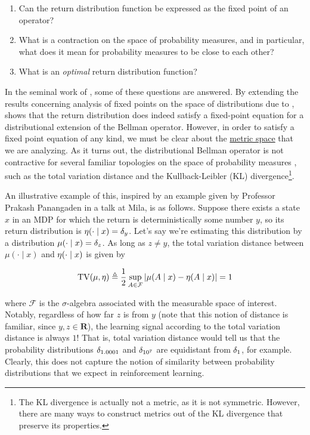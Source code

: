 \begin{enumerate}
\item Can the return distribution function be expressed as the fixed point of
  an operator?
\item What is a contraction on the space of probability measures, and
  in particular, what does it mean for probability measures to be
  close to each other?
\item What is an \emph{optimal} return distribution function?
\end{enumerate}

In the seminal work of \citet{Bellemare2017ADP}, some of these
questions are answered. By extending the results concerning analysis
of fixed points on the space of distributions due to
\citet{rosler1992fixed}, \citet{Bellemare2017ADP} shows that the
return distribution does indeed satisfy a fixed-point equation for a
distributional extension of the Bellman operator. However, in order to
satisfy a fixed point equation of any kind, we must be clear about the
\hyperref[def:metric-space]{metric space} that we are analyzing. As it
turns out, the distributional Bellman operator is not contractive for
several familiar topologies on the space of probability measures
\citep{Bellemare2017ADP}, such as the total variation distance and the
Kullback-Leibler (KL) divergence\footnote{The KL divergence is
  actually not a metric, as it is not symmetric. However, there are
  many ways to construct metrics out of the KL divergence that
  preserve its properties.}.

An illustrative example of this, inspired by an example given by Professor
Prakash Panangaden in a talk at Mila, is as follows. Suppose there
exists a state $x$ in an MDP for which the return is deterministically
some number $y$, so
its return distribution is $\operatorname{\eta}(\cdot\mid x) =
\delta_{y}$. Let's say we're estimating this distribution by a
distribution $\mu(\cdot\mid x) = \delta_{z}$. As long as $z\neq y$, the
total variation distance between $\mu(\cdot\mid x)$ and
$\operatorname{\eta}(\cdot\mid x)$ is given by

\begin{align*}
  \text{TV}(\mu,\operatorname{\eta})\triangleq\frac{1}{2}\sup_{A\in\mathcal{F}}\left\lvert
  \mu(A\mid x) - \operatorname{\eta}(A\mid x)\right\rvert = 1
\end{align*}

where $\mathcal{F}$ is the $\sigma$-algebra associated with the
measurable space of interest. Notably, regardless of how far $z$ is
from $y$ (note that this notion of distance is familiar, since
$y,z\in\mathbf{R}$), the learning signal according to the total
variation distance is always $1$! That is, total variation distance
would tell us that the probability distributions $\delta_{1.0001}$ and
$\delta_{10^7}$ are equidistant from $\delta_{1}$, for example. Clearly,
this does not capture the notion of similarity between probability distributions
that we expect in reinforcement learning.

